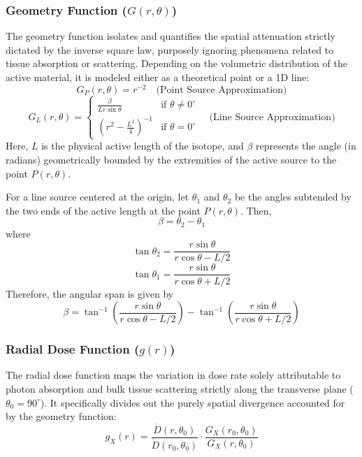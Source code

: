 \subsubsection{Geometry Function ($G(r, \theta)$)}
The geometry function isolates and quantifies the spatial attenuation strictly dictated by the inverse square law, purposely ignoring phenomena related to tissue absorption or scattering. Depending on the volumetric distribution of the active material, it is modeled either as a theoretical point or a 1D line:
\begin{equation}
    G_P(r, \theta) = r^{-2} \quad \text{(Point Source Approximation)}
\end{equation}
\begin{equation}
    G_L(r, \theta) = 
    \begin{cases} 
        \frac{\beta}{L r \sin\theta} & \text{if } \theta \neq 0^\circ \\
        (r^2 - \frac{L^2}{4})^{-1} & \text{if } \theta = 0^\circ 
    \end{cases} \quad \text{(Line Source Approximation)}
\end{equation}
Here, $L$ is the physical active length of the isotope, and $\beta$ represents the angle (in radians) geometrically bounded by the extremities of the active source to the point $P(r,\theta)$.

For a line source centered at the origin, let $\theta_1$ and $\theta_2$ be the angles subtended by the two ends of the active length at the point $P(r,\theta)$. Then,
\begin{equation}
    \beta = \theta_2 - \theta_1
\end{equation}
where
\begin{equation}
    \tan \theta_2 = \frac{r \sin\theta}{r \cos\theta - L/2}
\end{equation}
\begin{equation}
    \tan \theta_1 = \frac{r \sin\theta}{r \cos\theta + L/2}
\end{equation}
Therefore, the angular span is given by
\begin{equation}
    \beta = \tan^{-1}\left(\frac{r \sin\theta}{r \cos\theta - L/2}\right) - \tan^{-1}\left(\frac{r \sin\theta}{r \cos\theta + L/2}\right)
\end{equation}

\subsubsection{Radial Dose Function ($g(r)$)}
The radial dose function maps the variation in dose rate solely attributable to photon absorption and bulk tissue scattering strictly along the transverse plane ($\theta_0 = 90^\circ$). It specifically divides out the purely spatial divergence accounted for by the geometry function:
\begin{equation}
g_X(r) = \frac{\dot{D}(r, \theta_0)}{\dot{D}(r_0, \theta_0)} \cdot \frac{G_X(r_0, \theta_0)}{G_X(r, \theta_0)}
\end{equation}

